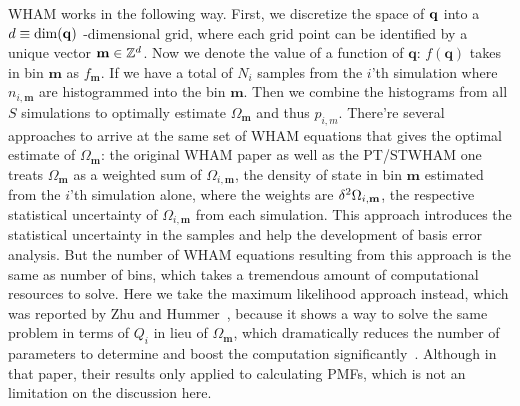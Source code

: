 WHAM works in the following way. First, we discretize the space of $\mathbf{q}$ 
into a $d \equiv \mathrm{dim}(\mathbf{q})$ -dimensional grid, where each grid point can be 
identified by a unique vector $\mathbf{m} \in \mathbb{Z}^{d}$. Now we denote the 
value of a function of $\mathbf{q}$: $f(\mathbf{q})$ takes in bin $\mathbf{m}$ 
as $f_\mathbf{m}$. If we have a total of $N_i$ samples from the $i$'th 
simulation where $n_{i,\mathbf{m}}$ are histogrammed into the bin $\mathbf{m}$. 
Then we combine the histograms from all $S$ simulations to optimally estimate 
$\Omega_{\mathbf{m}}$ and thus $p_{i,m}$. There're several approaches to arrive 
at the same set of WHAM equations that gives the optimal estimate of $\Omega_{\mathbf{m}}$: 
the original WHAM paper\cite{Kumar1992} as well as the PT/STWHAM one\cite{Chodera2007} 
treats $\Omega_\mathbf{m}$ as a weighted sum of $\Omega_{i,\mathbf{m}}$, 
the density of state in bin $\mathbf{m}$ estimated from the $i$'th simulation alone, 
where the weights are $\mathrm{\delta}^2 \Omega_{i,\mathbf{m}}$, the respective statistical 
uncertainty of $\Omega_{i,\mathbf{m}}$ from each simulation. This approach introduces
the statistical uncertainty in the samples and help the development of basis error 
analysis. But the number of WHAM equations resulting from this approach is the 
same as number of bins, which takes a tremendous amount of computational resources 
to solve. Here we take the maximum likelihood approach instead, which was reported 
by Zhu and Hummer~\cite{Zhu2012}, because it shows a way to solve the same problem 
in terms of $Q_i$ in lieu of $\Omega_\mathbf{m}$, which dramatically reduces the 
number of parameters to determine and boost the computation significantly~\cite{Zhu2012}.
Although in that paper, their results only applied to calculating PMFs, which is
not an limitation on the discussion here.

